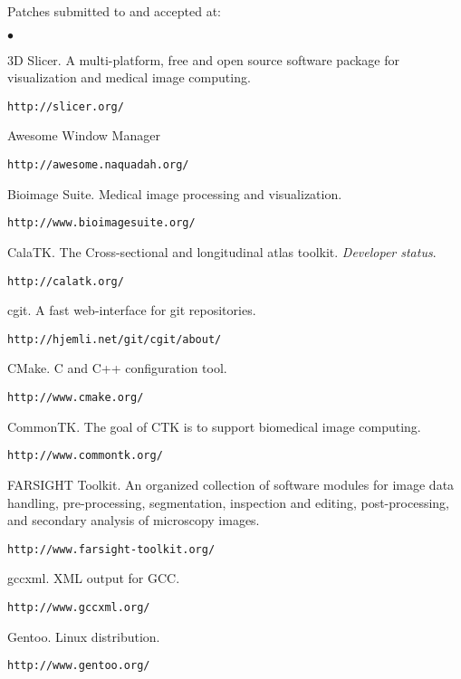 \documentclass[margin,line]{res}
\newenvironment{list2}{
  \begin{list}{$\bullet$}{%
      \setlength{\itemsep}{0in}
      \setlength{\parsep}{0in} \setlength{\parskip}{0in}
      \setlength{\topsep}{0in} \setlength{\partopsep}{0in} 
      \setlength{\leftmargin}{0.2in}}}{\end{list}}
\begin{document}
\begin{resume}
Patches submitted to and accepted at:
\begin{list2}
\item 3D Slicer.  A multi-platform, free and open source software package for
  visualization and medical image computing.
  \begin{verbatim}http://slicer.org/\end{verbatim}
\item Awesome Window Manager
  \begin{verbatim}http://awesome.naquadah.org/\end{verbatim}
\item Bioimage Suite.  Medical image processing and visualization.
  \begin{verbatim}http://www.bioimagesuite.org/\end{verbatim}
\item CalaTK.  The Cross-sectional and longitudinal atlas toolkit.  \textit{Developer status}.
  \begin{verbatim}http://calatk.org/\end{verbatim}
\item cgit. A fast web-interface for git repositories.
  \begin{verbatim}http://hjemli.net/git/cgit/about/\end{verbatim}
\item CMake.  C and C++ configuration tool.
  \begin{verbatim}http://www.cmake.org/\end{verbatim}
\item CommonTK.  The goal of CTK is to support biomedical image computing.
  \begin{verbatim}http://www.commontk.org/\end{verbatim}
\item FARSIGHT Toolkit.  An organized collection of software modules for image
  data handling, pre-processing, segmentation, inspection and editing,
  post-processing, and secondary analysis of microscopy images.
  \begin{verbatim}http://www.farsight-toolkit.org/\end{verbatim}
\item gccxml.  XML output for GCC.
  \begin{verbatim}http://www.gccxml.org/\end{verbatim}
\item Gentoo.  Linux distribution.
  \begin{verbatim}http://www.gentoo.org/\end{verbatim}

\end{list2}
\end{resume}
\end{document}
